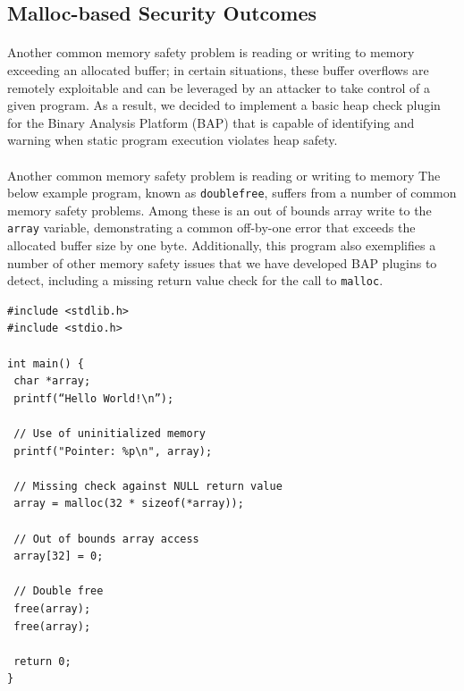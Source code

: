 \documentclass[letterpaper,11pt]{article}
\begin{document}
\subsection{Malloc-based Security Outcomes}
\paragraph{}
Another common memory safety problem is reading or writing to memory
exceeding an allocated buffer; in certain situations, these buffer overflows
are remotely exploitable and can be leveraged by an attacker to take control
of a given program. As a result, we decided to implement a basic heap check
plugin for the Binary Analysis Platform (BAP) that is capable of identifying
and warning when static program execution violates heap safety.

\paragraph{}
Another common memory safety problem is reading or writing to memory
The below example program, known as \texttt{doublefree}, suffers from a number of
common memory safety problems. Among these is an out of bounds array write to
the \texttt{array} variable, demonstrating a common off-by-one error that exceeds
the allocated buffer size by one byte. Additionally, this program also
exemplifies a number of other memory safety issues that we have developed BAP
plugins to detect, including a missing return value check for the call to
\texttt{malloc}.

\begin{center}
\lstset{language=C, label=freefree,
caption=malloc\_free.c, breaklines=true, basicstyle=\tiny, numbers=left}
\begin{lstlisting}
#include <stdlib.h>
#include <stdio.h>

int main() {
 char *array;
 printf(“Hello World!\n”);

 // Use of uninitialized memory
 printf("Pointer: %p\n", array);

 // Missing check against NULL return value
 array = malloc(32 * sizeof(*array));

 // Out of bounds array access
 array[32] = 0;

 // Double free
 free(array);
 free(array);

 return 0;
}
\end{lstlisting}
\end{center}
\end{document}
